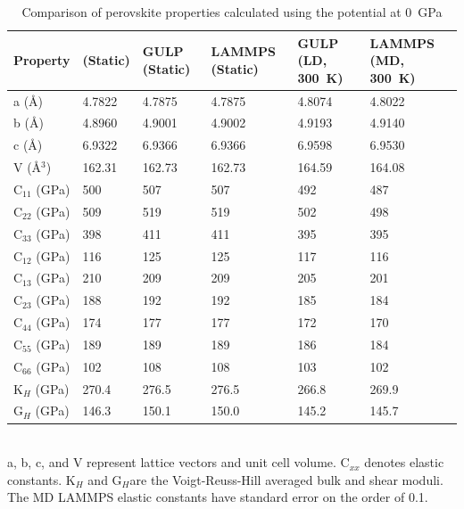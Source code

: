 \begin{table}
\centering
\caption{Comparison of \mgsios perovskite properties calculated using the \citet{Oganov2000} potential at 0~GPa}\vspace{2mm} 

\begin{tabular}{l|l|l|l|l|l}
\hline
Property  &  \citeauthor{Oganov2000} (Static) & GULP (Static) & LAMMPS (Static) & GULP (LD, 300~K) & LAMMPS (MD, 300~K) \\ \hline
a (\AA)                   & 4.7822               & 4.7875            & 4.7875         & 4.8074      & 4.8022	\\ 
b (\AA)                   & 4.8960               & 4.9001            & 4.9002          & 4.9193      & 4.9140	\\ 
c (\AA)   		      & 6.9322               & 6.9366            & 6.9366          & 6.9598      & 6.9530	\\ 
V (\AA$^{3}$)      & 162.31               & 162.73            & 162.73          & 164.59      & 164.08	\\ \hline
C$_{11}$ (GPa)     & 500                   & 507                 & 507               & 492           & 487	\\ 
C$_{22}$ (GPa)     & 509                   & 519                 & 519               & 502           & 498	\\ 
C$_{33}$ (GPa)     & 398                   & 411                 & 411               & 395           & 395	\\ 
C$_{12}$ (GPa)     & 116                   & 125                 & 125               & 117           & 116	\\ 
C$_{13}$ (GPa)     & 210                   & 209                 & 209               & 205           & 201	\\ 
C$_{23}$ (GPa)     & 188                   & 192                 & 192               & 185           & 184	\\ 
C$_{44}$ (GPa)     & 174                   & 177                 & 177               & 172           & 170	\\ 
C$_{55}$ (GPa)     & 189                   & 189                 & 189               & 186           & 184	\\ 
C$_{66}$ (GPa)     & 102                   & 108                 & 108               & 103           & 102	\\ \hline
K$_{H}$ (GPa)  & 270.4                & 276.5              & 276.5            & 266.8        & 269.9	\\ 
G$_{H}$ (GPa)  & 146.3                & 150.1              & 150.0            & 145.2        & 145.7	\\
\hline       
\end{tabular}
\\ \vspace{2mm}
a, b, c, and V represent lattice vectors and unit cell volume. C$_{xx}$ denotes elastic constants. K$_{H}$ and G$_{H}$are the Voigt-Reuss-Hill averaged bulk and shear moduli. The MD LAMMPS elastic constants have standard error on the order of 0.1.
\label{tab:oga_pot}
\end{table}

